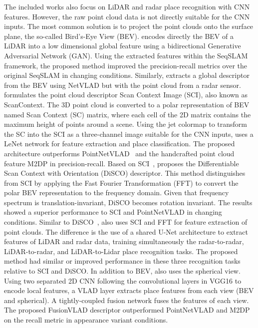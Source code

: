 The included works also focus on LiDAR and radar place recognition with CNN features. However, the raw point cloud data is not directly suitable for the CNN inputs. The most common solution is to project the point clouds onto the surface plane, the so-called Bird's-Eye View (BEV).
\cite{yin-et-al:2018:8593562} encodes directly the BEV of a LiDAR into a low dimensional global feature using a bidirectional Generative Adversarial Network (GAN). Using the extracted features within the SeqSLAM framework, the proposed method improved the precision-recall metrics over the original SeqSLAM in changing conditions.
Similarly, \cite{martini-et-al:2020:s20216002} extracts a global descriptor from the BEV using NetVLAD but with the point cloud from a radar sensor.
\cite{kim-et-al:2019:2897340} formulates the point cloud descriptor Scan Context Image (SCI), also known as ScanContext. The 3D point cloud is converted to a polar representation of BEV named Scan Context (SC) matrix, where each cell of the 2D matrix contains the maximum height of points around a scene. Using the jet colormap to transform the SC into the SCI as a three-channel image suitable for the CNN inputs, \cite{kim-et-al:2019:2897340} uses a LeNet network for feature extraction and place classification. The proposed architecture outperforms PointNetVLAD~\parencite{discussion:pointnetvlad} and the handcrafted point cloud feature M2DP in precision-recall.
Based on SCI~\parencite{kim-et-al:2019:2897340}, \cite{xu-et-al:2021:3060741} proposes the Differentiable Scan Context with Orientation (DiSCO) descriptor. This method distinguishes from SCI by applying the Fast Fourier Transformation (FFT) to convert the polar BEV representation to the frequency domain. Given that frequency spectrum is translation-invariant, DiSCO becomes rotation invariant. The results showed a superior performance to SCI and PointNetVLAD in changing conditions.
Similar to DiSCO~\parencite{xu-et-al:2021:3060741}, \cite{yin-et-al:2021:661199} also uses SCI and FFT for feature extraction of point clouds. The difference is the use of a shared U-Net architecture to extract features of LiDAR and radar data, training simultaneously the radar-to-radar, LiDAR-to-radar, and LiDAR-to-Lidar place recognition tasks. The proposed method had similar or improved performance in these three recognition tasks relative to SCI and DiSCO.
In addition to BEV, \cite{yin-et-al:2021:3061375} also uses the spherical view. Using two separated 2D CNN following the convolutional layers in VGG16 to encode local features, a VLAD layer extracts place features from each view (BEV and spherical). A tightly-coupled fusion network fuses the features of each view. The proposed FusionVLAD descriptor outperformed PointNetVLAD and M2DP on the recall metric in appearance variant conditions.

